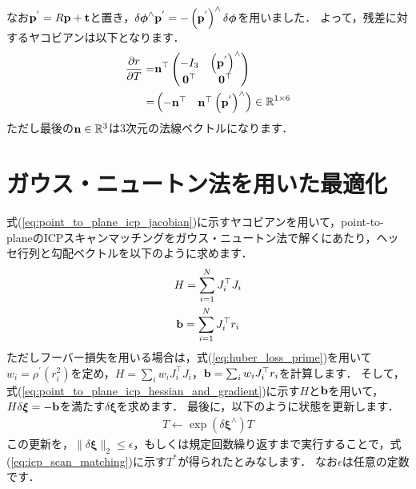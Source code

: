 %
なお${\bf p}^{'} = R {\bf p} + {\bf t}$と置き，$\delta \boldsymbol \phi^{\wedge} {\bf p}^{'} = -\left( {\bf p}^{'} \right)^{\wedge} \delta \boldsymbol \phi$を用いました．
よって，残差に対するヤコビアンは以下となります．
%
\begin{align}
  \begin{split}
    \frac{ \partial r }{ \partial T } = & {\bf n}^{\top} \left( \begin{matrix} -I_{3} & \left( {\bf p}^{'} \right)^{\wedge} \\ {\bf 0}^{\top} & {\bf 0}^{\top} \end{matrix} \right) \\
    = & \left( \begin{matrix} -{\bf n}^{\top} & {\bf n}^{\top} \left( {\bf p}^{'} \right)^{\wedge} \end{matrix} \right) \in \mathbb{R}^{1 \times 6}
  \end{split}
  \label{eq:point_to_plane_icp_jacobian}
\end{align}
%
ただし最後の${\bf n} \in \mathbb{R}^{3}$は3次元の法線ベクトルになります．













\section{ガウス・ニュートン法を用いた最適化}

式(\ref{eq:point_to_plane_icp_jacobian})に示すヤコビアンを用いて，point-to-planeのICPスキャンマッチングをガウス・ニュートン法で解くにあたり，ヘッセ行列と勾配ベクトルを以下のように求めます．
%
\begin{align}
  \begin{gathered}
    H = \sum_{i=1}^{N} J_{i}^{\top} J_{i} \\
    {\bf b} = \sum_{i=1}^{N} J_{i}^{\top} r_{i} 
  \end{gathered}
  \label{eq:point_to_plane_icp_hessian_and_gradient}
\end{align}
%
ただしフーバー損失を用いる場合は，式(\ref{eq:huber_loss_prime})を用いて$w_{i} = \rho^{\prime} \left( r_{i}^{2} \right)$を定め，$H = \sum_{i} w_{i} J_{i}^{\top} J_{i}$，${\bf b} = \sum_{i} w_{i} J_{i}^{\top} r_{i}$を計算します．
そして，式(\ref{eq:point_to_plane_icp_hessian_and_gradient})に示す$H$と${\bf b}$を用いて，$H \delta \boldsymbol \xi = -{\bf b}$を満たす$\delta \boldsymbol \xi$を求めます．
最後に，以下のように状態を更新します．
%
\begin{align}
  T \leftarrow \exp \left( \delta \boldsymbol \xi^{\wedge} \right) T
\end{align}
%
この更新を，$\| \delta \boldsymbol \xi \|_{2} \leq \epsilon$，もしくは規定回数繰り返すまで実行することで，式(\ref{eq:icp_scan_matching})に示す$T^{*}$が得られたとみなします．
なお$\epsilon$は任意の定数です．












